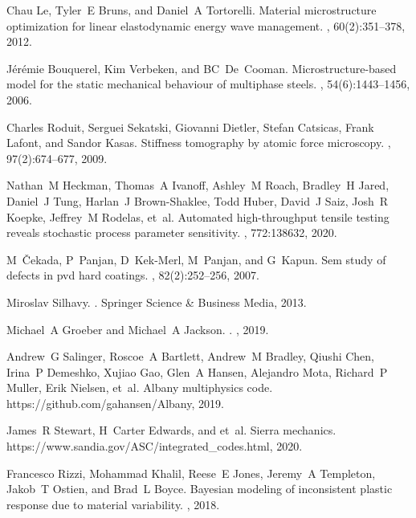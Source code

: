 \documentclass[12pt,reqno]{article}
\begin{document}
\begin{thebibliography}{10}
Chau Le, Tyler~E Bruns, and Daniel~A Tortorelli.
\newblock Material microstructure optimization for linear elastodynamic energy
wave management.
, 60(2):351--378,
2012.

J{\'e}r{\'e}mie Bouquerel, Kim Verbeken, and BC~De~Cooman.
\newblock Microstructure-based model for the static mechanical behaviour of
multiphase steels.
, 54(6):1443--1456, 2006.

Charles Roduit, Serguei Sekatski, Giovanni Dietler, Stefan Catsicas, Frank
Lafont, and Sandor Kasas.
\newblock Stiffness tomography by atomic force microscopy.
, 97(2):674--677, 2009.

Nathan~M Heckman, Thomas~A Ivanoff, Ashley~M Roach, Bradley~H Jared, Daniel~J
Tung, Harlan~J Brown-Shaklee, Todd Huber, David~J Saiz, Josh~R Koepke,
Jeffrey~M Rodelas, et~al.
\newblock Automated high-throughput tensile testing reveals stochastic process
parameter sensitivity.
, 772:138632, 2020.

M~{\v{C}}ekada, P~Panjan, D~Kek-Merl, M~Panjan, and G~Kapun.
\newblock Sem study of defects in pvd hard coatings.
, 82(2):252--256, 2007.

Miroslav Silhavy.
.
\newblock Springer Science \& Business Media, 2013.

Michael~A Groeber and Michael~A Jackson.
.
, 2019.

Andrew~G Salinger, Roscoe~A Bartlett, Andrew~M Bradley, Qiushi Chen, Irina~P
Demeshko, Xujiao Gao, Glen~A Hansen, Alejandro Mota, Richard~P Muller, Erik
Nielsen, et~al.
\newblock Albany multiphysics code.
\newblock https://github.com/gahansen/Albany, 2019.

James~R Stewart, H~Carter Edwards, and et~al.
\newblock Sierra mechanics.
\newblock https://www.sandia.gov/ASC/integrated\_codes.html, 2020.

Francesco Rizzi, Mohammad Khalil, Reese~E Jones, Jeremy~A Templeton, Jakob~T
Ostien, and Brad~L Boyce.
\newblock Bayesian modeling of inconsistent plastic response due to material
variability.
, 2018.


\end{thebibliography}
\end{document}

